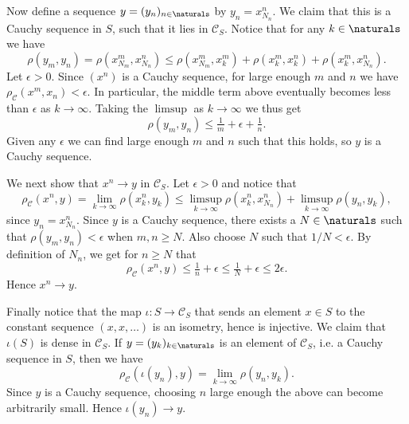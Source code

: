 \documentclass[a4paper, 11pt]{memoir}
\theoremstyle{plaincustomnumber}
\theoremstyle{changedotbreakcustomnumber}
\newcommand{\calC}{\mathcal{C}}
\begin{document}
Now define a sequence $y = (y_n)_{n \in \naturals}$ by $y_n = x^n_{N_n}$. We claim that this is a Cauchy sequence in $S$, such that it lies in $\calC_S$. Notice that for any $k \in \naturals$ we have
%
\begin{equation*}
    \rho(y_m,y_n)
        = \rho(x^m_{N_m}, x^n_{N_n})
        \leq \rho(x^m_{N_m}, x^m_k) + \rho(x^m_k, x^n_k) + \rho(x^m_k, x^n_{N_n}).
\end{equation*}
%
Let $\epsilon > 0$. Since $(x^n)$ is a Cauchy sequence, for large enough $m$ and $n$ we have $\rho_\calC(x^m,x_n) < \epsilon$. In particular, the middle term above eventually becomes less than $\epsilon$ as $k \to \infty$. Taking the $\limsup$ as $k \to \infty$ we thus get
%
\begin{equation*}
    \rho(y_m,y_n)
        \leq \tfrac{1}{m} + \epsilon + \tfrac{1}{n}.
\end{equation*}
%
Given any $\epsilon$ we can find large enough $m$ and $n$ such that this holds, so $y$ is a Cauchy sequence.

We next show that $x^n \to y$ in $\calC_S$. Let $\epsilon > 0$ and notice that
%
\begin{equation*}
    \rho_\calC(x^n,y)
        = \lim_{k \to \infty} \rho(x^n_k, y_k)
        \leq \limsup_{k \to \infty} \rho(x^n_k, x^n_{N_n})
             + \limsup_{k \to \infty} \rho(y_n, y_k),
\end{equation*}
%
since $y_n = x^n_{N_n}$. Since $y$ is a Cauchy sequence, there exists a $N \in \naturals$ such that $\rho(y_m,y_n) < \epsilon$ when $m,n \geq N$. Also choose $N$ such that $1/N < \epsilon$. By definition of $N_n$, we get for $n \geq N$ that
%
\begin{equation*}
    \rho_\calC(x^n,y)
        \leq \tfrac{1}{n} + \epsilon
        \leq \tfrac{1}{N} + \epsilon
        \leq 2\epsilon.
\end{equation*}
%
Hence $x^n \to y$.

Finally notice that the map $\iota \colon S \to \calC_S$ that sends an element $x \in S$ to the constant sequence $(x,x,\ldots)$ is an isometry, hence is injective. We claim that $\iota(S)$ is dense in $\calC_S$. If $y = (y_k)_{k \in \naturals}$ is an element of $\calC_S$, i.e. a Cauchy sequence in $S$, then we have
%
\begin{equation*}
    \rho_\calC(\iota(y_n),y)
        = \lim_{k \to \infty} \rho(y_n, y_k).
\end{equation*}
%
Since $y$ is a Cauchy sequence, choosing $n$ large enough the above can become arbitrarily small. Hence $\iota(y_n) \to y$.
\end{document}
